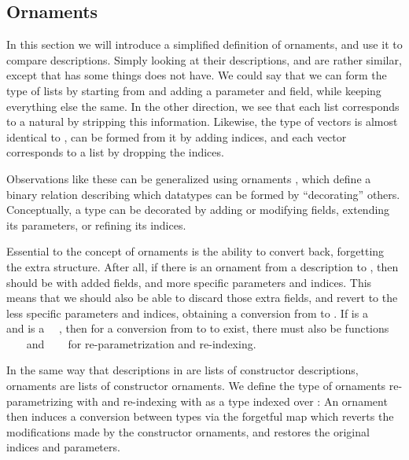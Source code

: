 \subsection{Ornaments}\label{sec:background-ornaments}
In this section we will introduce a simplified definition of ornaments, and use it to compare descriptions. Simply looking at their descriptions, \bN{} and  are rather similar, except that  has some things \bN{} does not have. We could say that we can form the type of lists by starting from \bN{} and adding a parameter and field, while keeping everything else the same. In the other direction, we see that each list corresponds to a natural by stripping this information. Likewise, the type of vectors is almost identical to , can be formed from it by adding indices, and each vector corresponds to a list by dropping the indices.

Observations like these can be generalized using ornaments \cite{algorn, progorn, sijsling}, which define a binary relation describing which datatypes can be formed by ``decorating'' others. Conceptually, a type can be decorated by adding or modifying fields, extending its parameters, or refining its indices.

Essential to the concept of ornaments is the ability to convert back, forgetting the extra structure. After all, if there is an ornament from a description  to , then  should be  with added fields, and more specific parameters and indices. This means that we should also be able to discard those extra fields, and revert to the less specific parameters and indices, obtaining a conversion from  to . If  is a \ \  and  is a \ \ , then for a conversion from  to  to exist, there must also be functions \ \ \   and \ \ \  for re-parametrization and re-indexing.

In the same way that descriptions in  are lists of constructor descriptions, ornaments are lists of constructor ornaments. We define the type of ornaments re-parametrizing with  and re-indexing with  as a type indexed over :
An ornament then induces a conversion between types via the forgetful map
which reverts the modifications made by the constructor ornaments, and restores the original indices and parameters.

